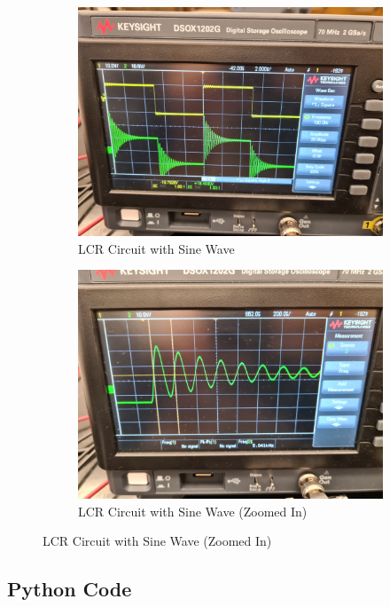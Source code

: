 \documentclass[a4paper,12pt]{article}
\begin{document}
\begin{figure}[H]
  \centering
  \begin{subfigure}{.5\textwidth}
    \centering
    \includegraphics[width=.9\linewidth]{../data/20211116_110612.jpg}
    \caption{LCR Circuit with Sine Wave}
  \end{subfigure}%
  \begin{subfigure}{.5\textwidth}
    \centering
    \includegraphics[width=.9\linewidth]{../data/20211116_110834.jpg}
    \caption{LCR Circuit with Sine Wave (Zoomed In)}
  \end{subfigure}
\end{figure}

\pagebreak

\subsection{Python Code}
\end{document}
